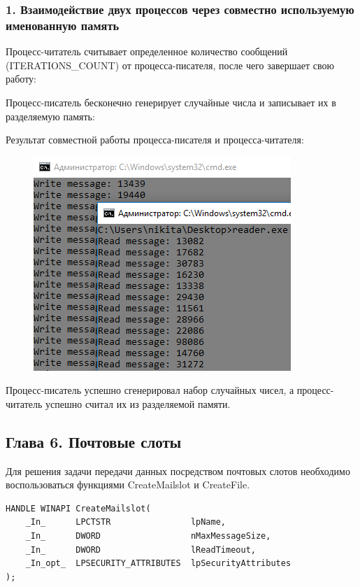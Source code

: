\documentclass[14pt,a4paper,report]{report}
\begin{document}
\subsubsection{1. Взаимодействие двух процессов через совместно используемую именованную память}

Процесс-читатель считывает определенное количество сообщений (ITERATIONS\_COUNT) от процесса-писателя, после чего завершает свою работу:



Процесс-писатель бесконечно генерирует случайные числа и записывает их в разделяемую память:



Результат совместной работы процесса-писателя и процесса-читателя:

\begin{figure}[h!]
	\centering
	\includegraphics[scale = 0.9]{images/p5.png}
	
	\caption{}
	\label{image:25}
\end{figure}

Процесс-писатель успешно сгенерировал набор случайных чисел, а процесс-читатель успешно считал их из разделяемой памяти.

\subsection{Глава 6. Почтовые слоты}

Для решения задачи передачи данных посредством почтовых слотов необходимо воспользоваться функциями CreateMailslot и CreateFile. 

\begin{verbatim}
HANDLE WINAPI CreateMailslot(
    _In_      LPCTSTR                lpName,
    _In_      DWORD                  nMaxMessageSize,
    _In_      DWORD                  lReadTimeout,
    _In_opt_  LPSECURITY_ATTRIBUTES  lpSecurityAttributes
);
\end{verbatim}
\end{document}

